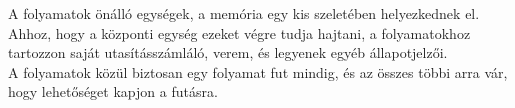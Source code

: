 \documentclass[tikz,12pt,margin=0px]{article}
\begin{document}

    \noindent A folyamatok önálló egységek, a memória egy kis szeletében helyezkednek el. Ahhoz, hogy a központi egység ezeket végre tudja hajtani, a folyamatokhoz tartozzon saját utasításszámláló, verem, és legyenek egyéb állapotjelzői.\\

    \noindent A folyamatok közül biztosan egy folyamat fut mindig, és az összes többi arra vár, hogy lehetőséget kapjon a futásra.\\
\end{document}
